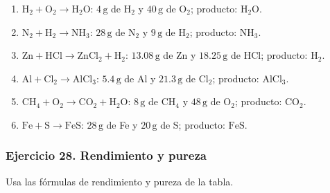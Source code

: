 \begin{enumerate}
    \item[a)] $\mathrm{H_2}+\mathrm{O_2}\rightarrow\mathrm{H_2O}$:
    $4\,\mathrm{g}$ de $\mathrm{H_2}$ y $40\,\mathrm{g}$ de $\mathrm{O_2}$;
    producto: $\mathrm{H_2O}$.

    \item[b)] $\mathrm{N_2}+\mathrm{H_2}\rightarrow\mathrm{NH_3}$:
    $28\,\mathrm{g}$ de $\mathrm{N_2}$ y $9\,\mathrm{g}$ de $\mathrm{H_2}$;
    producto: $\mathrm{NH_3}$.

    \item[c)] $\mathrm{Zn}+\mathrm{HCl}\rightarrow\mathrm{ZnCl_2}+\mathrm{H_2}$:
    $13.08\,\mathrm{g}$ de Zn y $18.25\,\mathrm{g}$ de $\mathrm{HCl}$;
    producto: $\mathrm{H_2}$.

    \item[d)] $\mathrm{Al}+\mathrm{Cl_2}\rightarrow\mathrm{AlCl_3}$:
    $5.4\,\mathrm{g}$ de Al y $21.3\,\mathrm{g}$ de $\mathrm{Cl_2}$;
    producto: $\mathrm{AlCl_3}$.

    \item[e)] $\mathrm{CH_4}+\mathrm{O_2}\rightarrow
    \mathrm{CO_2}+\mathrm{H_2O}$:
    $8\,\mathrm{g}$ de $\mathrm{CH_4}$ y $48\,\mathrm{g}$ de $\mathrm{O_2}$;
    producto: $\mathrm{CO_2}$.

    \item[f)] $\mathrm{Fe}+\mathrm{S}\rightarrow\mathrm{FeS}$:
    $28\,\mathrm{g}$ de Fe y $20\,\mathrm{g}$ de S;
    producto: $\mathrm{FeS}$.
\end{enumerate}

\subsubsection*{Ejercicio 28. Rendimiento y pureza}

Usa las fórmulas de rendimiento y pureza de la tabla.

